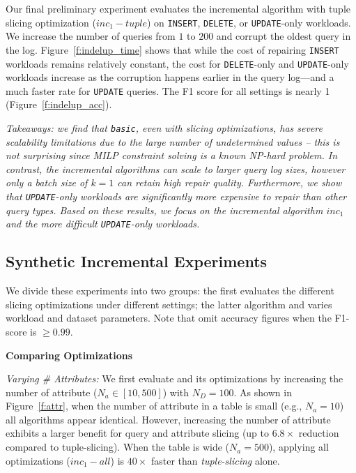 \label{sec:indelup}
Our final preliminary experiment evaluates the incremental algorithm with tuple slicing optimization 
($inc_1-tuple$) on \texttt{INSERT}, \texttt{DELETE}, or \texttt{UPDATE}-only workloads.
We increase the number of queries from $1$ to $200$ and corrupt the oldest query in the log.  
Figure~\ref{f:indelup_time} shows that while the cost of repairing \texttt{INSERT} workloads
remains relatively constant, the cost for \texttt{DELETE}-only and \texttt{UPDATE}-only workloads increase as 
the corruption happens earlier in the query log---and a much faster rate for \texttt{UPDATE} queries.
The F1 score for all settings is nearly 1 (Figure~\ref{f:indelup_acc}).

\smallskip
{\it Takeaways: we find that \texttt{basic}, even with slicing optimizations,
has severe scalability limitations due to the large number of undetermined values -- this is not surprising
since MILP constraint solving is a known NP-hard problem.
In contrast, the incremental algorithms can scale to larger query log sizes, however only a batch size of $k=1$ can retain high repair quality.
Furthermore, we show that \texttt{UPDATE}-only workloads are significantly more expensive to repair than other query types. 
Based on these results, we focus on the incremental algorithm $inc_1$ and the more difficult \texttt{UPDATE}-only workloads.
}

\subsection{Synthetic Incremental Experiments}
\label{sec:experiments:synth}
We divide these experiments into two groups: the first evaluates the different slicing optimizations under different settings; 
the latter algorithm and varies workload and dataset parameters.
Note that omit accuracy figures when the F1-score is $\ge 0.99$.

\noindent\textbf{Comparing Optimizations}

\emph{Varying \# Attributes:}
We first evaluate \sys and its optimizations by increasing the number of attribute ($N_a \in [10, 500]$) with $N_D = 100$.
As shown in Figure~\ref{f:attr}, when the number of attribute in a table is small (e.g., $N_a=10$) all algorithms appear identical. 
However, increasing the number of attribute exhibits a larger benefit for query and attribute slicing (up to $6.8\times$ reduction compared to tuple-slicing).
When the table is wide ($N_a = 500$), applying all optimizations ($inc_1-all$) is $40\times$ faster than \emph{tuple-slicing} alone.  

